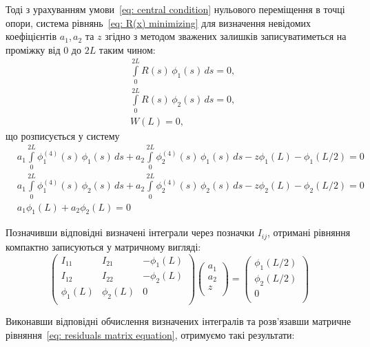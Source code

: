 \documentclass{mathreport}
\begin{document}
\newpage
Тоді з урахуванням умови~\eqref{eq: central condition} нульового переміщення в точці опори, система рівнянь~\eqref{eq: R(x) minimizing} для визначення невідомих коефіцієнтів $a_1,a_2$ та $z$ згідно з методом зважених залишків записуватиметься на проміжку від $0$ до $2L$ таким чином:
\begin{align}
    & \int\limits_{0}^{2L} R(s)\, \phi_1(s)\, ds = 0, \\
    & \int\limits_{0}^{2L} R(s)\, \phi_2(s)\, ds = 0, \\
    & W(L) = 0, 
\end{align}
що розписується у систему 
\begin{align}
    & a_1\int\limits_{0}^{2L} \phi_1^{(4)}(s)\, \phi_1(s)\, ds + a_2\int\limits_{0}^{2L} \phi_2^{(4)}(s)\, \phi_1(s)\, ds- z\phi_1(L)-\phi_1(L/2) = 0 \\
    & a_1\int\limits_{0}^{2L} \phi_1^{(4)}(s)\, \phi_2(s)\, ds + a_2\int\limits_{0}^{2L} \phi_2^{(4)}(s)\, \phi_2(s)\, ds- z\phi_2(L)-\phi_2(L/2) = 0 \\
    & a_1\phi_1(L) + a_2\phi_2(L) = 0
\end{align}

Позначивши відповідні визначені інтеграли через позначки $I_{ij}$, отримані рівняння компактно записуються у матричному вигляді:
\begin{equation}\label{eq: residuals matrix equation}
    \begin{pmatrix}
        I_{11}    & I_{21}    & -\phi_1(L) \\
        I_{12}    & I_{22}    & -\phi_2(L) \\
        \phi_1(L) & \phi_2(L) & 0          \\
    \end{pmatrix}
    \begin{pmatrix}
        a_1 \\
        a_2 \\
        z \\
    \end{pmatrix} = 
    \begin{pmatrix}
        \phi_1(L/2) \\
        \phi_2(L/2) \\
        0           \\
    \end{pmatrix}
\end{equation} 

Виконавши відповідні обчислення визначених інтегралів та розв'язавши матричне рівняння~\eqref{eq: residuals matrix equation}, отримуємо такі результати:
\end{document}
